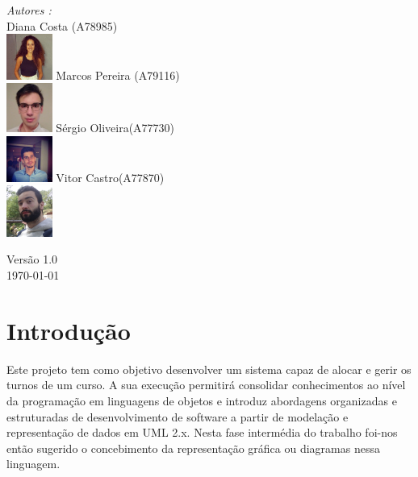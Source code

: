 \documentclass[a4paper]{article}
\begin{document}
\begin{titlepage}
\begin{center}
\noindent
\begin{minipage}{0.4\textwidth}
  \begin{flushleft} \large
    \emph{Autores :}\\
    Diana Costa \textsc{(A78985)}\\
    \includegraphics[width=1.5cm]{diana}\break
    Marcos Pereira \textsc{(A79116)}\\
    \includegraphics[width=1.5cm]{marcos}\break
    Sérgio Oliveira\textsc{(A77730)}\\
    \includegraphics[width=1.5cm]{sergio}\break
    Vitor Castro\textsc{(A77870)}\\
    \includegraphics[width=1.5cm]{vitor}\break
  \end{flushleft}
\end{minipage}%
\vfill

{\large Versão 1.0 \\ \today}

\end{center}
\end{titlepage}


\pagebreak
\tableofcontents

\pagebreak
\section{Introdução}
\label{sec:1}

Este projeto tem como objetivo desenvolver um sistema capaz de alocar e gerir os turnos de um curso. A sua execução permitirá consolidar conhecimentos ao nível da programação em linguagens de objetos e introduz abordagens organizadas e estruturadas de desenvolvimento de software a partir de modelação e representação de dados em UML 2.x. 
Nesta fase intermédia do trabalho foi-nos então sugerido o concebimento da representação gráfica ou diagramas nessa linguagem.
\end{document}
